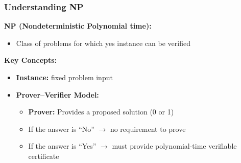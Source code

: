 \begin{frame}
  \frametitle{Understanding NP}
  
  \textbf{NP (Nondeterministic Polynomial time):}
  \begin{itemize}
      \item Class of problems for which yes instance can be verified
  \end{itemize}
  
  \vspace{0.3cm}
  
  \textbf{Key Concepts:}
  \begin{itemize}
      \item \textbf{Instance:} fixed problem input
      \vspace{0.2cm}
      \item \textbf{Prover–Verifier Model:}
      \begin{itemize}
          \item \textbf{Prover:} Provides a proposed solution (0 or 1)
          \item If the answer is ``No'' $\rightarrow$ no requirement to prove
          \item If the answer is ``Yes'' $\rightarrow$ must provide polynomial-time verifiable certificate
      \end{itemize}
  \end{itemize}
\end{frame}

